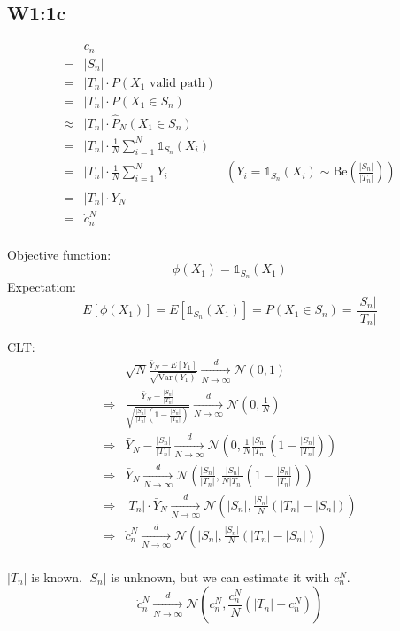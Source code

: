 \documentclass{article}
\begin{document}
\subsection{W1:1c}

\begin{align*}
   & c_n \\
   =& |S_n| \\
   =& |T_n|\cdot P(X_1\text{ valid path}) \\
   =& |T_n|\cdot P(X_1\in S_n) \\
   \approx& |T_n|\cdot \hat{P}_N(X_1\in S_n) \\
   =& |T_n|\cdot \frac{1}{N}\sum_{i=1}^N\mathds{1}_{S_n}(X_i) \\
   =& |T_n|\cdot \frac{1}{N}\sum_{i=1}^N Y_i & (Y_i=\mathds{1}_{S_n}(X_i)\sim \text{Be}\left(\frac{|S_n|}{|T_n|}\right)) \\
   =& |T_n|\cdot \bar{Y}_N \\
   =& \dot{c}_n^N \\
\end{align*}

Objective function:
\[\phi(X_1) = \mathds{1}_{S_n}(X_1)\]
Expectation:
\[E[\phi(X_1)] = E[\mathds{1}_{S_n}(X_1)] = P(X_1 \in S_n) = \frac{|S_n|}{|T_n|}\]

CLT:
\begin{align*}
   & \sqrt{N}\frac{\bar{Y}_N-E[Y_1]}{\sqrt{\text{Var}(Y_1)}} \xrightarrow[N\to\infty]{d} \mathcal{N}(0,1) \\
   \Rightarrow& \frac{\bar{Y}_N-\frac{|S_n|}{|T_n|}}{\sqrt{\frac{|S_n|}{|T_n|}(1-\frac{|S_n|}{|T_n|})}} \xrightarrow[N\to\infty]{d} \mathcal{N}(0,\frac{1}{N}) \\
   \Rightarrow& \bar{Y}_N-\frac{|S_n|}{|T_n|} \xrightarrow[N\to\infty]{d} \mathcal{N}(0,\frac{1}{N}\frac{|S_n|}{|T_n|}(1-\frac{|S_n|}{|T_n|})) \\
   \Rightarrow& \bar{Y}_N \xrightarrow[N\to\infty]{d} \mathcal{N}\left(\frac{|S_n|}{|T_n|},\frac{|S_n|}{N|T_n|}(1-\frac{|S_n|}{|T_n|})\right) \\
   \Rightarrow& |T_n|\cdot\bar{Y}_N \xrightarrow[N\to\infty]{d} \mathcal{N}\left(|S_n|,\frac{|S_n|}{N}(|T_n|-|S_n|)\right) \\
   \Rightarrow& \dot{c}_n^N \xrightarrow[N\to\infty]{d} \mathcal{N}\left(|S_n|,\frac{|S_n|}{N}(|T_n|-|S_n|)\right) \\
\end{align*}

\(|T_n|\) is known.
\(|S_n|\) is unknown, but we can estimate it with \(c_n^N\).
\[\dot{c}_n^N \xrightarrow[N\to\infty]{d} \mathcal{N}\left(c_n^N,\frac{c_n^N}{N}(|T_n|-c_n^N)\right)\]
\end{document}
